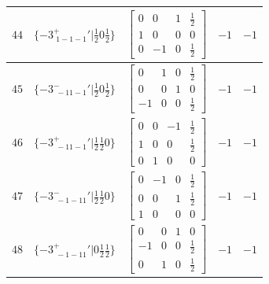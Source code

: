 \documentclass[fleqn,8pt]{jsarticle}
\begin{document}
\begin{longtable}{ccccc}
$ 44 $ & $ \{-3^{+}_{\,\,1-1-1}{}'|\frac{1}{2} 0 \frac{1}{2}\} $ & $ \begin{bmatrix} 0 & 0 & 1 & \frac{1}{2} \\ 1 & 0 & 0 & 0 \\ 0 & -1 & 0 & \frac{1}{2} \end{bmatrix} $ & $ -1 $ & $ -1 $ \\ \hline
$ 45 $ & $ \{-3^{-}_{\,\,-11-1}{}'|\frac{1}{2} 0 \frac{1}{2}\} $ & $ \begin{bmatrix} 0 & 1 & 0 & \frac{1}{2} \\ 0 & 0 & 1 & 0 \\ -1 & 0 & 0 & \frac{1}{2} \end{bmatrix} $ & $ -1 $ & $ -1 $ \\ \hline
$ 46 $ & $ \{-3^{+}_{\,\,-11-1}{}'|\frac{1}{2} \frac{1}{2} 0\} $ & $ \begin{bmatrix} 0 & 0 & -1 & \frac{1}{2} \\ 1 & 0 & 0 & \frac{1}{2} \\ 0 & 1 & 0 & 0 \end{bmatrix} $ & $ -1 $ & $ -1 $ \\ \hline
$ 47 $ & $ \{-3^{-}_{\,\,-1-11}{}'|\frac{1}{2} \frac{1}{2} 0\} $ & $ \begin{bmatrix} 0 & -1 & 0 & \frac{1}{2} \\ 0 & 0 & 1 & \frac{1}{2} \\ 1 & 0 & 0 & 0 \end{bmatrix} $ & $ -1 $ & $ -1 $ \\ \hline
$ 48 $ & $ \{-3^{+}_{\,\,-1-11}{}'|0 \frac{1}{2} \frac{1}{2}\} $ & $ \begin{bmatrix} 0 & 0 & 1 & 0 \\ -1 & 0 & 0 & \frac{1}{2} \\ 0 & 1 & 0 & \frac{1}{2} \end{bmatrix} $ & $ -1 $ & $ -1 $ \\
\end{longtable}
\end{document}
